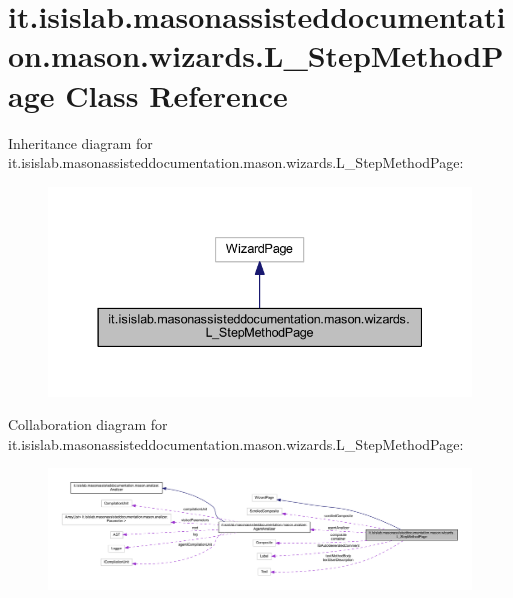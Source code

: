\hypertarget{classit_1_1isislab_1_1masonassisteddocumentation_1_1mason_1_1wizards_1_1_l___step_method_page}{\section{it.\-isislab.\-masonassisteddocumentation.\-mason.\-wizards.\-L\-\_\-\-Step\-Method\-Page Class Reference}
\label{classit_1_1isislab_1_1masonassisteddocumentation_1_1mason_1_1wizards_1_1_l___step_method_page}
}


Inheritance diagram for it.\-isislab.\-masonassisteddocumentation.\-mason.\-wizards.\-L\-\_\-\-Step\-Method\-Page\-:\nopagebreak
\begin{figure}[H]
\begin{center}
\leavevmode
\includegraphics[width=337pt]{classit_1_1isislab_1_1masonassisteddocumentation_1_1mason_1_1wizards_1_1_l___step_method_page__inherit__graph}
\end{center}
\end{figure}


Collaboration diagram for it.\-isislab.\-masonassisteddocumentation.\-mason.\-wizards.\-L\-\_\-\-Step\-Method\-Page\-:\nopagebreak
\begin{figure}[H]
\begin{center}
\leavevmode
\includegraphics[width=350pt]{classit_1_1isislab_1_1masonassisteddocumentation_1_1mason_1_1wizards_1_1_l___step_method_page__coll__graph}
\end{center}
\end{figure}
